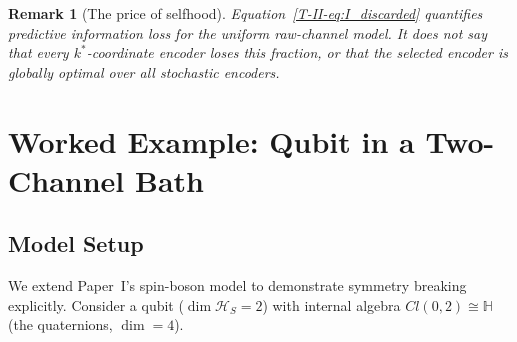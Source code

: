 \documentclass[12pt,a4paper,openany]{book}
\newtheorem{remark}[theorem]{Remark}
\begin{document}
\begin{remark}[The price of selfhood]
\label{T-II-rem:price}
Equation~\eqref{T-II-eq:I_discarded} quantifies predictive information loss
for the uniform raw-channel model.  It does not say that every
$k^*$-coordinate encoder loses this fraction, or that the selected
encoder is globally optimal over all stochastic encoders.
\end{remark}

\section{Worked Example: Qubit in a Two-Channel Bath}
\label{T-II-sec:example}

\subsection{Model Setup}
\label{T-II-subsec:model}

We extend Paper~I's spin-boson model to demonstrate
symmetry breaking explicitly.
Consider a qubit ($\dim \mathcal{H}_S = 2$) with internal
algebra $Cl(0,2) \cong \mathbb{H}$ (the quaternions,
$\dim = 4$).
\end{document}
